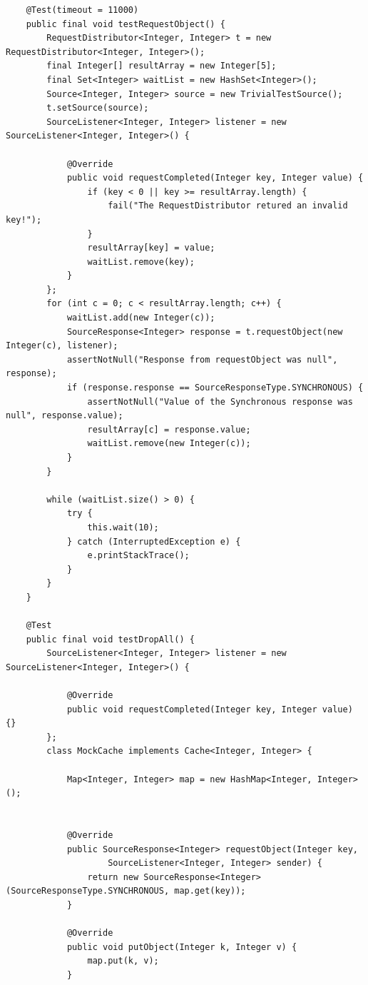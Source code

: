 \documentclass[10pt]{scrreprt}
\begin{document}
\begin{lstlisting}
    @Test(timeout = 11000)
    public final void testRequestObject() {
        RequestDistributor<Integer, Integer> t = new RequestDistributor<Integer, Integer>();
        final Integer[] resultArray = new Integer[5];
        final Set<Integer> waitList = new HashSet<Integer>();
        Source<Integer, Integer> source = new TrivialTestSource();
        t.setSource(source);
        SourceListener<Integer, Integer> listener = new SourceListener<Integer, Integer>() {

            @Override
            public void requestCompleted(Integer key, Integer value) {
                if (key < 0 || key >= resultArray.length) {
                    fail("The RequestDistributor retured an invalid key!");
                }
                resultArray[key] = value;
                waitList.remove(key);
            }
        };
        for (int c = 0; c < resultArray.length; c++) {
            waitList.add(new Integer(c));
            SourceResponse<Integer> response = t.requestObject(new Integer(c), listener);
            assertNotNull("Response from requestObject was null", response);
            if (response.response == SourceResponseType.SYNCHRONOUS) {
                assertNotNull("Value of the Synchronous response was null", response.value);
                resultArray[c] = response.value;
                waitList.remove(new Integer(c));
            }
        }

        while (waitList.size() > 0) {
            try {
                this.wait(10);
            } catch (InterruptedException e) {
                e.printStackTrace();
            }
        }
    }

    @Test
    public final void testDropAll() {
        SourceListener<Integer, Integer> listener = new SourceListener<Integer, Integer>() {

            @Override
            public void requestCompleted(Integer key, Integer value) {}
        };
        class MockCache implements Cache<Integer, Integer> {

            Map<Integer, Integer> map = new HashMap<Integer, Integer>();


            @Override
            public SourceResponse<Integer> requestObject(Integer key,
                    SourceListener<Integer, Integer> sender) {
                return new SourceResponse<Integer>(SourceResponseType.SYNCHRONOUS, map.get(key));
            }

            @Override
            public void putObject(Integer k, Integer v) {
                map.put(k, v);
            }


\end{lstlisting}
\end{document}
